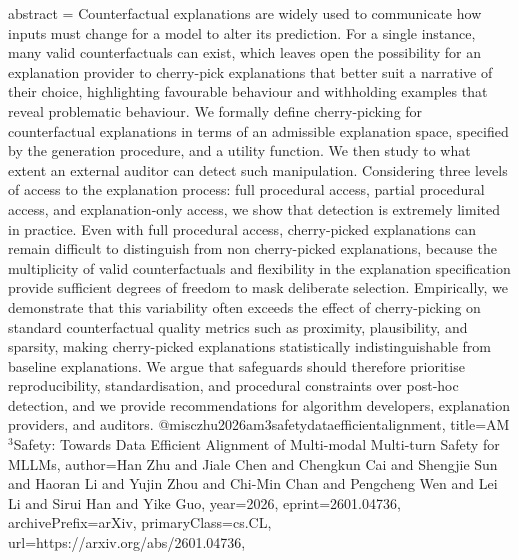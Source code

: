 {      abstract = {Counterfactual explanations are widely used to communicate how inputs must change for a model to alter its prediction. For a single instance, many valid counterfactuals can exist, which leaves open the possibility for an explanation provider to cherry-pick explanations that better suit a narrative of their choice, highlighting favourable behaviour and withholding examples that reveal problematic behaviour. We formally define cherry-picking for counterfactual explanations in terms of an admissible explanation space, specified by the generation procedure, and a utility function. We then study to what extent an external auditor can detect such manipulation. Considering three levels of access to the explanation process: full procedural access, partial procedural access, and explanation-only access, we show that detection is extremely limited in practice. Even with full procedural access, cherry-picked explanations can remain difficult to distinguish from non cherry-picked explanations, because the multiplicity of valid counterfactuals and flexibility in the explanation specification provide sufficient degrees of freedom to mask deliberate selection. Empirically, we demonstrate that this variability often exceeds the effect of cherry-picking on standard counterfactual quality metrics such as proximity, plausibility, and sparsity, making cherry-picked explanations statistically indistinguishable from baseline explanations. We argue that safeguards should therefore prioritise reproducibility, standardisation, and procedural constraints over post-hoc detection, and we provide recommendations for algorithm developers, explanation providers, and auditors.}
}@misc{zhu2026am3safetydataefficientalignment,
      title={AM$^3$Safety: Towards Data Efficient Alignment of Multi-modal Multi-turn Safety for MLLMs}, 
      author={Han Zhu and Jiale Chen and Chengkun Cai and Shengjie Sun and Haoran Li and Yujin Zhou and Chi-Min Chan and Pengcheng Wen and Lei Li and Sirui Han and Yike Guo},
      year={2026},
      eprint={2601.04736},
      archivePrefix={arXiv},
      primaryClass={cs.CL},
      url={https://arxiv.org/abs/2601.04736},
}
